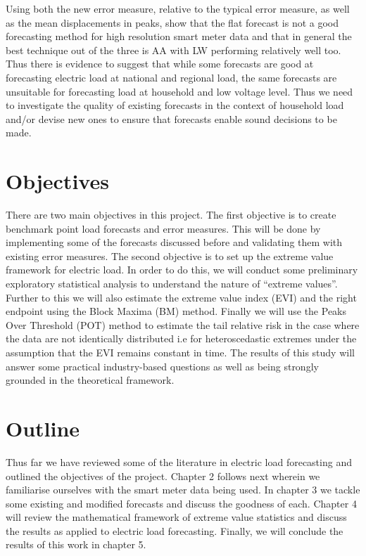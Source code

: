 Using both the new error measure, relative to the typical error measure, as well as the mean displacements in peaks, \cite{dan14} show that the flat forecast is not a good forecasting method for high resolution smart meter data and that in general the best technique out of the three is AA with LW performing relatively well too. Thus there is evidence to suggest that while some forecasts are good at forecasting electric load at national and regional load, the same forecasts are unsuitable for forecasting load at household and low voltage level. Thus we need to investigate the quality of existing forecasts in the context of household load and/or devise new ones to ensure that forecasts enable sound decisions to be made.


\section{Objectives} \label{subsec:objectives}

There are two main objectives in this project. The first objective is to create benchmark point load forecasts and error measures. This will be done by implementing some of the forecasts discussed before and validating them with existing error measures. The second objective is to set up the extreme value framework for electric load. In order to do this, we will conduct some preliminary exploratory statistical analysis to understand the nature of ``extreme values''. Further to this we will also estimate the extreme value index (EVI) and the right endpoint using the Block Maxima (BM) method. Finally we will use the Peaks Over Threshold (POT) method to estimate the tail relative risk in the case where the data are not identically distributed i.e for heteroscedastic extremes under the assumption that the EVI remains constant in time. The results of this study will answer some practical industry-based questions as well as being strongly grounded in the theoretical framework.


\section{Outline}

Thus far we have reviewed some of the literature in electric load forecasting and outlined the objectives of the project. Chapter 2 follows next wherein we familiarise ourselves with the smart meter data being used. In chapter 3 we tackle some existing and modified forecasts and discuss the goodness of each. Chapter 4 will review the mathematical framework of extreme value statistics and discuss the results as applied to electric load forecasting. Finally, we will conclude the results of this work in chapter 5.
